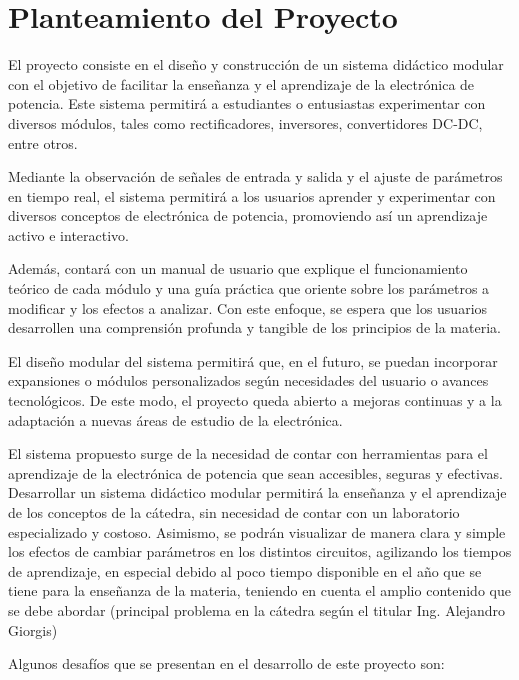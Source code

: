 \section*{Planteamiento del Proyecto}
\justifying

El proyecto consiste en el diseño y construcción de un sistema didáctico modular con el objetivo de
facilitar la enseñanza y el aprendizaje de la electrónica de potencia. Este sistema permitirá a 
estudiantes o entusiastas experimentar con 
diversos módulos, tales como rectificadores, inversores, convertidores DC-DC, entre otros.

Mediante la observación de señales de entrada y salida y el ajuste de parámetros en tiempo real,
el sistema permitirá a los usuarios aprender y experimentar con diversos conceptos de
electrónica de potencia, promoviendo así un aprendizaje activo e interactivo.

Además, contará con un manual de usuario que explique el funcionamiento teórico de cada módulo y
una guía práctica que oriente sobre los parámetros a modificar y los efectos a analizar. Con 
este enfoque, se espera que los usuarios desarrollen una comprensión profunda y tangible de los 
principios de la materia.

El diseño modular del sistema permitirá que, en el futuro, se puedan incorporar
expansiones o módulos personalizados según necesidades del usuario o avances tecnológicos.
De este modo, el proyecto queda abierto a mejoras continuas y a la adaptación a nuevas áreas
de estudio de la electrónica.

El sistema propuesto surge de la necesidad de contar con herramientas para el aprendizaje de la
electrónica de potencia que sean accesibles, seguras y efectivas. Desarrollar un sistema didáctico
modular permitirá la enseñanza y el aprendizaje de los conceptos de la cátedra, sin necesidad de
contar con un laboratorio especializado y costoso. Asimismo, se podrán visualizar de manera clara
y simple los efectos de cambiar parámetros en los distintos circuitos, agilizando los tiempos de
aprendizaje, en especial debido al poco tiempo disponible en el año que se tiene para la enseñanza
de la materia, teniendo en cuenta el amplio contenido que se debe abordar (principal problema
en la cátedra según el titular Ing. Alejandro Giorgis) 

Algunos desafíos que se presentan en el desarrollo de este proyecto son:

